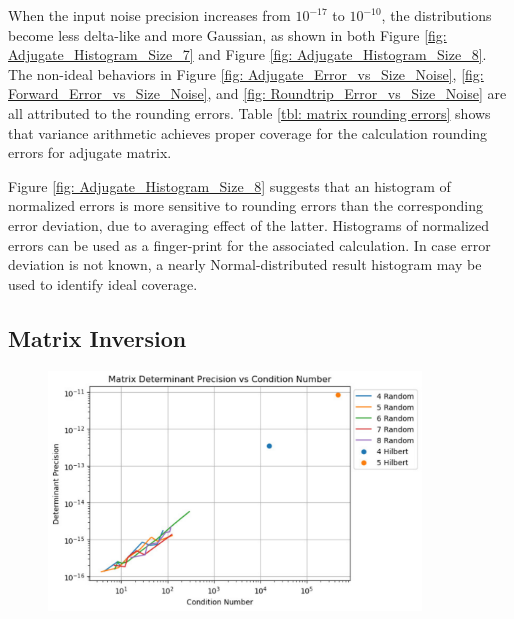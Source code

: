 \documentclass[twoside]{article}
\numberwithin{equation}{section}
\begin{document}
When the input noise precision increases from $10^{-17}$ to  $10^{-10}$, the distributions become less delta-like and more Gaussian, as shown in both Figure \ref{fig: Adjugate_Histogram_Size_7} and Figure \ref{fig: Adjugate_Histogram_Size_8}. 
The non-ideal behaviors in Figure \ref{fig: Adjugate_Error_vs_Size_Noise}, \ref{fig: Forward_Error_vs_Size_Noise}, and \ref{fig: Roundtrip_Error_vs_Size_Noise} are all attributed to the rounding errors.
Table \ref{tbl: matrix rounding errors} shows that variance arithmetic achieves proper coverage for the calculation rounding errors for adjugate matrix.

Figure \ref{fig: Adjugate_Histogram_Size_8} suggests that an histogram of normalized errors is more sensitive to rounding errors than the corresponding error deviation, due to averaging effect of the latter.
Histograms of normalized errors can be used as a finger-print for  the associated calculation.
In case error deviation is not known, a nearly Normal-distributed result histogram may be used to identify ideal coverage.



\subsection{Matrix Inversion}

\begin{figure}[p]
\centering
\includegraphics[height=2.5in]{Matrix_Determinant_Prec_vs_Condition.pdf} 
\label{fig: Matrix_Determinant_Prec_vs_Condition}
\end{figure}
\end{document}
